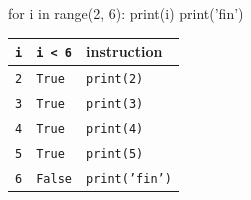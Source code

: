 	\begin{minipage}{0.45\linewidth}
		
	\begin{exemple}{}
		\begin{CodePythontexAlt}[Largeur=1\linewidth,Centre,PremLigne=1]{}
		for i in range(2, 6):
			print(i)
		print('fin')
	\end{CodePythontexAlt}
	
		\end{exemple}

	\end{minipage}\hfill{}
	\begin{minipage}{0.55\linewidth}
	
	\renewcommand{\arraystretch}{1.1}
	\begin{center}
	\begin{tabular}{|c|p{2cm}|p{4cm}|}
		\hline
		\texttt{i}  & \texttt{i < 6} & instruction \\ \hline
		\texttt{2}  & \texttt{True} & \texttt{print(2)} \\ \hline
		\texttt{3}  & \texttt{True} & \texttt{print(3)} \\ \hline
		\texttt{4}  & \texttt{True} & \texttt{print(4)} \\ \hline
		\texttt{5}  & \texttt{True} & \texttt{print(5)} \\ \hline
		\texttt{6}  & \texttt{False} & \texttt{print('fin')} \\ \hline
	\end{tabular}	
	\end{center}
	
	\end{minipage}
	

